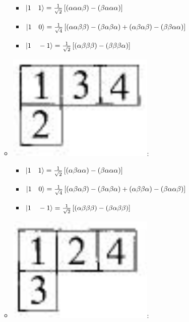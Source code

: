 \documentclass[12pt,a4paper]{article}
\begin{document}
\begin{itemize}
\begin{itemize}
\begin{itemize}
\item  $\ket{1\quad 1} = \frac{1}{\sqrt{2}}  \left[ 
\left( \alpha\alpha\alpha \beta\right) - \left(  \beta \alpha\alpha\alpha\right) 
 \right]$
 \item  $\ket{1\quad 0} = \frac{1}{\sqrt{4}}  \left[ 
\left( \alpha\alpha\beta\beta \right) - \left( \beta \alpha\beta\alpha \right) +
\left( \alpha\beta \alpha\beta \right) - \left( \beta \beta \alpha\alpha\right) 
 \right]$
 \item  $\ket{1\quad -1} = \frac{1}{\sqrt{2}}  \left[ 
\left( \alpha\beta\beta\beta \right) - \left( \beta\beta\beta\alpha \right) 
 \right]$
\end{itemize}
\item \includegraphics[scale=0.2]{build/young-31-134.png}: 
\begin{itemize}
\item $\ket{1\quad 1} = \frac{1}{\sqrt{2}}  \left[ 
\left( \alpha \beta \alpha\alpha \right) - \left( \beta \alpha\alpha\alpha\right) 
 \right]$
\item  $\ket{1\quad 0} = \frac{1}{\sqrt{4}}  \left[ 
\left( \alpha\beta\alpha\beta\right) - \left(\beta\alpha\beta\alpha \right) +
\left( \alpha\beta\beta\alpha \right) - \left( \beta \alpha\alpha\beta \right) 
 \right]$ 
\item  $\ket{1\quad -1} = \frac{1}{\sqrt{2}}  \left[ 
\left( \alpha\beta\beta\beta\right) - \left( \beta\alpha\beta\beta\right) 
 \right]$
\end{itemize}
\item \includegraphics[scale=0.2]{build/young-31-124.png}: 

\end{itemize}
\end{itemize}
\end{document}
